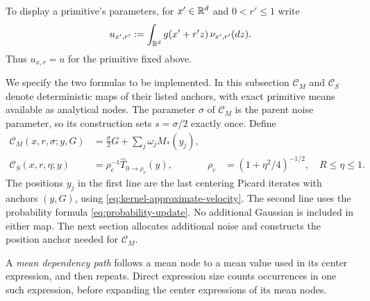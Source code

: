 To display a primitive's parameters, for $x'\in\mathbb R^d$ and
$0<r'\le1$ write
\[
 u_{x',r'}:=\int_{\mathbb R^d}g(x'+r'z)\,\nu_{x',r'}(dz).
\]
Thus $u_{x,r}=u$ for the primitive fixed above.

We specify the two formulas to be implemented.  In this subsection
$\mathcal C_M$ and $\mathcal C_S$ denote deterministic maps of their
listed anchors, with exact primitive means available as analytical
nodes.  The parameter $\sigma$ of $\mathcal C_M$ is the parent
noise parameter, so its construction sets $s=\sigma/2$ exactly once.
Define
\begin{align}
 \mathcal C_M(x,r,\sigma;y,G)
   &=\frac\sigma2G+\sum_j\omega_jM_*(y_j),
       \label{eq:exact-mean-circuit}\\
 \mathcal C_S(x,r,\eta;y)
   &=\rho_e^{-1}\widehat T_{0\to\rho_e}(y),
 &\rho_e&=(1+\eta^2/4)^{-1/2},\quad R\le\eta\le1.
       \label{eq:exact-sample-circuit}
\end{align}
The positions $y_j$ in the first line are the last centering Picard
iterates with anchors $(y,G)$, using \eqref{eq:kernel-approximate-velocity}.
The second line uses the probability formula
\eqref{eq:probability-update}.  No additional Gaussian is included in
either map.  The next section allocates additional noise and constructs
the position anchor needed for $\mathcal C_M$.

A \emph{mean dependency path} follows a mean node to a mean value used
in its center expression, and then repeats.  Direct expression size
counts occurrences in one such expression, before expanding the center
expressions of its mean nodes.

